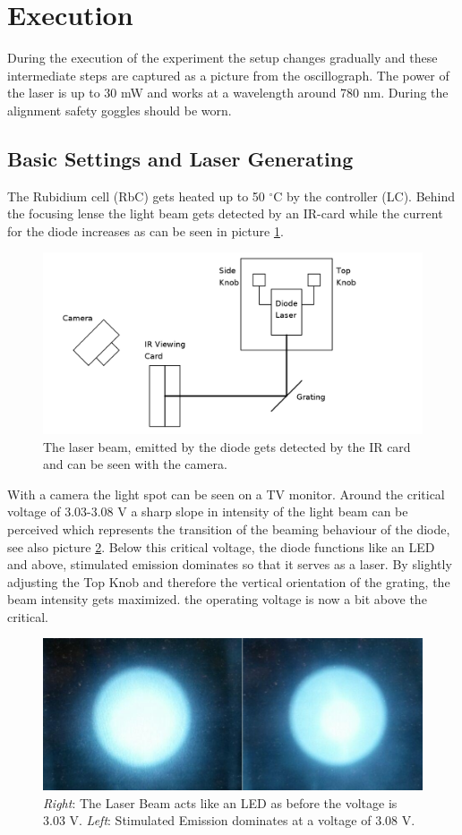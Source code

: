\section{Execution}
During the execution of the experiment the setup changes gradually and these intermediate steps are captured as a picture from the oscillograph. The power
of the laser is up to 30 mW and works at a wavelength around 780 nm. During the alignment safety goggles should be worn.
\subsection{Basic Settings and Laser Generating}
The Rubidium cell (RbC) gets heated up to 50 $^\circ$C by the controller (LC). Behind the focusing lense the light beam gets detected by an IR-card while
the current for the diode increases as can be seen in picture \ref{pic_setup1}. 
\begin{figure}[t]
 \includegraphics[width=\textwidth]{../pics/setup1.png}
 \caption{The laser beam, emitted by the diode gets detected by the IR card and can be seen with the camera.}
 \label{pic_setup1}
\end{figure}
With a camera the light spot can be seen on a TV monitor. Around the critical
voltage of 3.03-3.08 V a sharp slope in intensity of the light beam can be perceived which represents the transition of the beaming behaviour of the diode,
see also picture \ref{pic_stains}.
Below this critical voltage, the diode functions like an LED and above, stimulated emission dominates so that it serves as a laser. By slightly adjusting
the Top Knob and therefore the vertical orientation of the grating, the beam intensity gets maximized. the operating voltage is now a bit above the critical.
\begin{figure}
 \includegraphics[width=\textwidth]{../pics/stains.jpg}
 \caption{\textit{Right}: The Laser Beam acts like an LED as before the voltage is 3.03 V. \textit{Left}: Stimulated Emission dominates at a voltage of
 3.08 V.}
 \label{pic_stains}
\end{figure}


